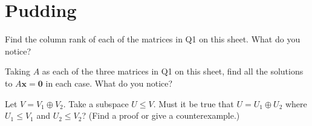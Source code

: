 \documentclass[answers]{exam}
\begin{document}
\section*{Pudding}
\begin{questions}

\question%
Find the column rank of each of the matrices in Q1 on this sheet. What do you notice?



\question%
Taking $A$ as each of the three matrices in Q1 on this sheet, find all the solutions to $A \mathbf{x}=\mathbf{0}$ in each case. What do you notice?



\question%
Let $V=V_{1} \oplus V_{2}$. Take a subspace $U \leqslant V$. Must it be true that $U=U_{1} \oplus U_{2}$ where $U_{1} \leqslant V_{1}$ and $U_{2} \leqslant V_{2}$? (Find a proof or give a counterexample.)

\end{questions}
\end{document}
